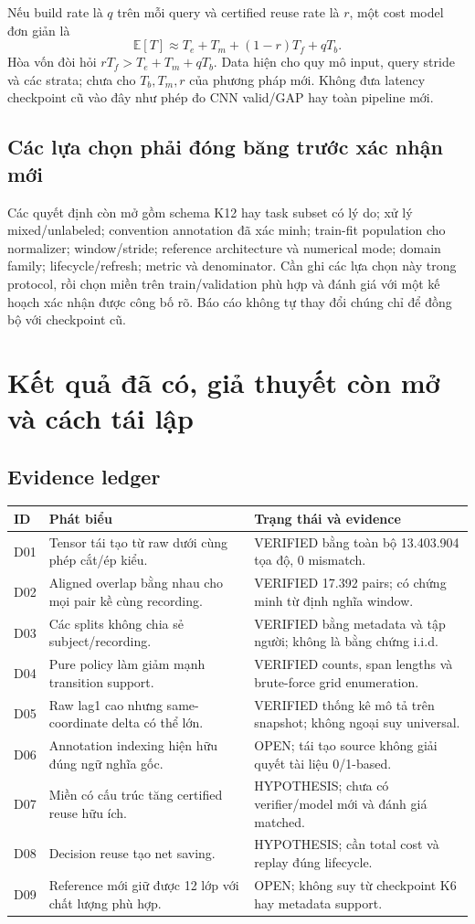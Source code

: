 \documentclass[11pt,a4paper]{article}
\theoremstyle{definition}
\begin{document}
Nếu build rate là $q$ trên mỗi query và certified reuse rate là $r$, một
cost model đơn giản là
\begin{equation}
\mathbb E[T]\approx T_e+T_m+(1-r)T_f+qT_b.
\end{equation}
Hòa vốn đòi hỏi $rT_f>T_e+T_m+qT_b$. Data hiện cho quy mô input, query
stride và các strata; chưa cho $T_b,T_m,r$ của phương pháp mới. Không đưa
latency checkpoint cũ vào đây như phép đo CNN valid/GAP hay toàn pipeline mới.

\subsection{Các lựa chọn phải đóng băng trước xác nhận mới}
Các quyết định còn mở gồm schema K12 hay task subset có lý do; xử lý
mixed/unlabeled; convention annotation đã xác minh; train-fit population
cho normalizer; window/stride; reference architecture và numerical mode;
domain family; lifecycle/refresh; metric và denominator. Cần ghi các lựa
chọn này trong protocol, rồi chọn miền trên train/validation phù hợp và
đánh giá với một kế hoạch xác nhận được công bố rõ. Báo cáo không tự thay
đổi chúng chỉ để đồng bộ với checkpoint cũ.

\section{Kết quả đã có, giả thuyết còn mở và cách tái lập}
\subsection{Evidence ledger}
\begin{longtable}{@{}P{1cm}P{6.0cm}P{5.7cm}@{}}\toprule
ID & Phát biểu & Trạng thái và evidence\\\midrule\endhead
D01 & Tensor tái tạo từ raw dưới cùng phép cắt/ép kiểu. & VERIFIED bằng toàn bộ 13.403.904 tọa độ, 0 mismatch.\\
D02 & Aligned overlap bằng nhau cho mọi pair kề cùng recording. & VERIFIED 17.392 pairs; có chứng minh từ định nghĩa window.\\
D03 & Các splits không chia sẻ subject/recording. & VERIFIED bằng metadata và tập người; không là bằng chứng i.i.d.\\
D04 & Pure policy làm giảm mạnh transition support. & VERIFIED counts, span lengths và brute-force grid enumeration.\\
D05 & Raw lag1 cao nhưng same-coordinate delta có thể lớn. & VERIFIED thống kê mô tả trên snapshot; không ngoại suy universal.\\
D06 & Annotation indexing hiện hữu đúng ngữ nghĩa gốc. & OPEN; tái tạo source không giải quyết tài liệu 0/1-based.\\
D07 & Miền có cấu trúc tăng certified reuse hữu ích. & HYPOTHESIS; chưa có verifier/model mới và đánh giá matched.\\
D08 & Decision reuse tạo net saving. & HYPOTHESIS; cần total cost và replay đúng lifecycle.\\
D09 & Reference mới giữ được 12 lớp với chất lượng phù hợp. & OPEN; không suy từ checkpoint K6 hay metadata support.\\\bottomrule
\end{longtable}
\end{document}
